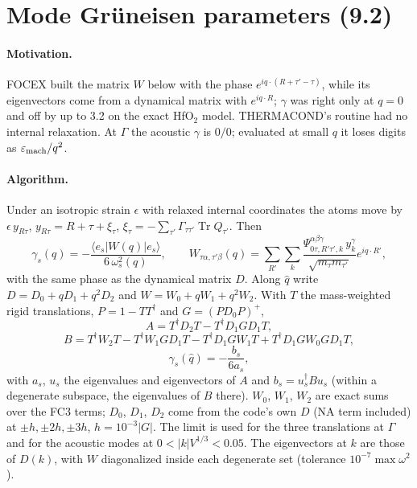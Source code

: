 \documentclass[11pt,a4paper]{article}
\newcommand{\Tr}{\operatorname{Tr}}
\begin{document}
\section{Mode Gr\"uneisen parameters (9.2)}\label{sec:grun}
\paragraph{Motivation.} FOCEX built the matrix $W$ below with the phase $e^{iq\cdot(R+\tau'-\tau)}$, while
its eigenvectors come from a dynamical matrix with $e^{iq\cdot R}$; $\gamma$ was right only at $q=0$ and off
by up to 3.2 on the exact HfO$_2$ model. THERMACOND's routine had no internal relaxation. At $\Gamma$ the
acoustic $\gamma$ is $0/0$; evaluated at small $q$ it loses digits as $\varepsilon_{\rm mach}/q^2$.

\paragraph{Algorithm.} Under an isotropic strain $\epsilon$ with relaxed internal coordinates the atoms
move by $\epsilon\,y_{R\tau}$, $y_{R\tau}=R+\tau+\xi_\tau$, $\xi_\tau=-\sum_{\tau'}\Gamma_{\tau\tau'}\Tr Q_{\tau'}$. Then
\begin{equation}
\gamma_s(q)=-\frac{\langle e_s|W(q)|e_s\rangle}{6\,\omega_s^2(q)},\qquad
W_{\tau\alpha,\tau'\beta}(q)=\sum_{R'}\sum_k\frac{\Psi^{\alpha\beta\gamma}_{0\tau,R'\tau',k}\,y_k^\gamma}{\sqrt{m_\tau m_{\tau'}}}e^{iq\cdot R'} ,
\end{equation}
with the same phase as the dynamical matrix $D$. Along $\hat q$ write $D=D_0+qD_1+q^2D_2$ and
$W=W_0+qW_1+q^2W_2$. With $T$ the mass-weighted rigid translations, $P=1-TT^\dagger$ and
$G=(PD_0P)^+$,
\begin{equation}
A=T^\dagger D_2T-T^\dagger D_1GD_1T,
\end{equation}
\begin{equation}
B=T^\dagger W_2T-T^\dagger W_1GD_1T-T^\dagger D_1GW_1T+T^\dagger D_1GW_0GD_1T,
\end{equation}
\begin{equation}
\gamma_s(\hat q)=-\frac{b_s}{6a_s},
\end{equation}
with $a_s$, $u_s$ the eigenvalues and eigenvectors of $A$ and $b_s=u_s^\dagger Bu_s$ (within a degenerate
subspace, the eigenvalues of $B$ there). $W_0$, $W_1$, $W_2$ are exact sums over the FC3 terms; $D_0$,
$D_1$, $D_2$ come from the code's own $D$ (NA term included) at $\pm h,\pm2h,\pm3h$, $h=10^{-3}|G|$. The limit
is used for the three translations at $\Gamma$ and for the acoustic modes at $0<|k|V^{1/3}<0.05$. The
eigenvectors at $k$ are those of $D(k)$, with $W$ diagonalized inside each degenerate set (tolerance
$10^{-7}\max\omega^2$).
\end{document}
